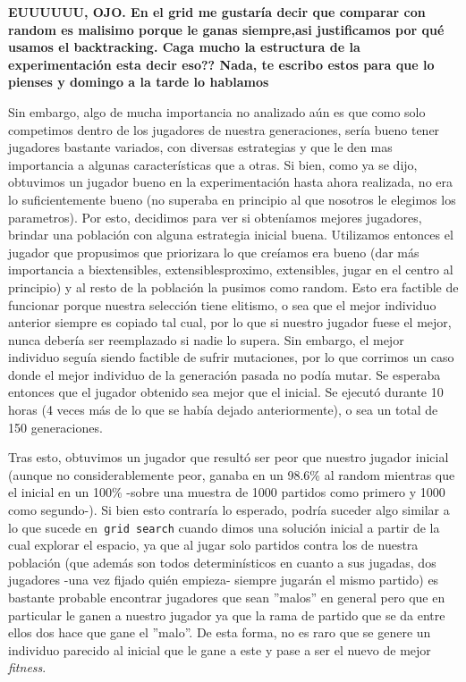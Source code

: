 \documentclass[A4paper,oneside,fleqn,11pt]{article}
\theoremstyle{definition}
\begin{document}
\textbf{EUUUUUU, OJO. En el grid me gustaría decir que comparar con random es malisimo porque le ganas siempre,asi justificamos por qué usamos el backtracking. Caga mucho la estructura de la experimentación esta decir eso?? Nada, te escribo estos para que lo pienses y domingo a la tarde lo hablamos}


Sin embargo, algo de mucha importancia no analizado aún es que como solo competimos dentro de los jugadores de nuestra generaciones, sería bueno tener jugadores bastante variados, con diversas estrategias y que le den mas importancia a algunas características que a otras. Si bien, como ya se dijo, obtuvimos un jugador bueno en la experimentación hasta ahora realizada, no era lo suficientemente bueno (no superaba en principio al que nosotros le elegimos los parametros). Por esto, decidimos para ver si obteníamos mejores jugadores, brindar una población con alguna estrategia inicial buena. Utilizamos entonces el jugador que propusimos que priorizara lo que creíamos era bueno (dar más importancia a biextensibles, extensiblesproximo, extensibles, jugar en el centro al principio) y al resto de la población la pusimos como random. Esto era factible de funcionar porque nuestra selección tiene elitismo, o sea que el mejor individuo anterior siempre es copiado tal cual, por lo que si nuestro jugador fuese el mejor, nunca debería ser reemplazado si nadie lo supera. Sin embargo, el mejor individuo seguía siendo factible de sufrir mutaciones, por lo que corrimos un caso donde el mejor individuo de la generación pasada no podía mutar. Se esperaba entonces que el jugador obtenido sea mejor que el inicial. Se ejecutó durante 10 horas (4 veces más de lo que se había dejado anteriormente), o sea un total de 150 generaciones. 

Tras esto, obtuvimos un jugador que resultó ser peor que nuestro jugador inicial (aunque no considerablemente peor, ganaba en un 98.6\% al random mientras que el inicial en un 100\% -sobre una muestra de 1000 partidos como primero y 1000 como segundo-). Si bien esto contraría lo esperado, podría suceder algo similar a lo que sucede en\texttt{ grid search} cuando dimos una solución inicial a partir de la cual explorar el espacio, ya que al jugar solo partidos contra los de nuestra población (que además son todos determinísticos en cuanto a sus jugadas, dos jugadores -una vez fijado quién empieza- siempre jugarán el mismo partido) es bastante probable encontrar jugadores que sean ''malos'' en general pero que en particular le ganen a nuestro jugador ya que la rama de partido que se da entre ellos dos hace que gane el ''malo''. De esta forma, no es raro que se genere un individuo parecido al inicial que le gane a este y pase a ser el nuevo de mejor \textit{fitness}.
\end{document}
